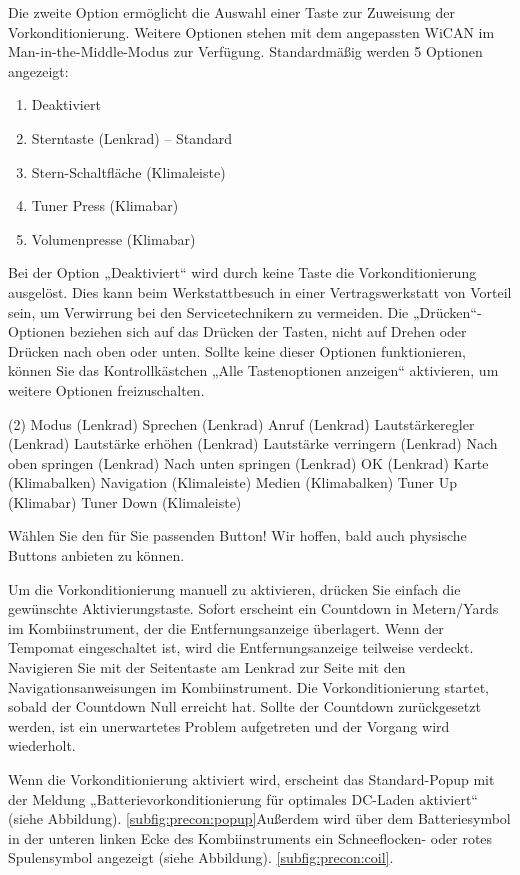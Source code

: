 \documentclass[superscriptaddress,onecolumn,floatfix]{revtex4-2}
\begin{document}
Die zweite Option ermöglicht die Auswahl einer Taste zur Zuweisung der Vorkonditionierung. Weitere Optionen stehen mit dem angepassten WiCAN im Man-in-the-Middle-Modus zur Verfügung. Standardmäßig werden 5 Optionen angezeigt:
\begin{enumerate}
  \item Deaktiviert
  \item Sterntaste (Lenkrad) -- Standard
  \item Stern-Schaltfläche (Klimaleiste)
  \item Tuner Press (Klimabar)
  \item Volumenpresse (Klimabar)
\end{enumerate}
Bei der Option „Deaktiviert“ wird durch keine Taste die Vorkonditionierung ausgelöst. Dies kann beim Werkstattbesuch in einer Vertragswerkstatt von Vorteil sein, um Verwirrung bei den Servicetechnikern zu vermeiden. Die „Drücken“-Optionen beziehen sich auf das Drücken der Tasten, nicht auf Drehen oder Drücken nach oben oder unten. Sollte keine dieser Optionen funktionieren, können Sie das Kontrollkästchen „Alle Tastenoptionen anzeigen“ aktivieren, um weitere Optionen freizuschalten.
\begin{tasks}(2)
  \task Modus (Lenkrad)
  \task Sprechen (Lenkrad)
  \task Anruf (Lenkrad)
  \task Lautstärkeregler (Lenkrad)
  \task Lautstärke erhöhen (Lenkrad)
  \task Lautstärke verringern (Lenkrad)
  \task Nach oben springen (Lenkrad)
  \task Nach unten springen (Lenkrad)
  \task OK (Lenkrad)
  \task Karte (Klimabalken)
  \task Navigation (Klimaleiste)
  \task Medien (Klimabalken)
  \task Tuner Up (Klimabar)
  \task Tuner Down (Klimaleiste)
\end{tasks}
Wählen Sie den für Sie passenden Button! Wir hoffen, bald auch physische Buttons anbieten zu können.

Um die Vorkonditionierung manuell zu aktivieren, drücken Sie einfach die gewünschte Aktivierungstaste. Sofort erscheint ein Countdown in Metern/Yards im Kombiinstrument, der die Entfernungsanzeige überlagert. Wenn der Tempomat eingeschaltet ist, wird die Entfernungsanzeige teilweise verdeckt. Navigieren Sie mit der Seitentaste am Lenkrad zur Seite mit den Navigationsanweisungen im Kombiinstrument. Die Vorkonditionierung startet, sobald der Countdown Null erreicht hat. Sollte der Countdown zurückgesetzt werden, ist ein unerwartetes Problem aufgetreten und der Vorgang wird wiederholt. 

Wenn die Vorkonditionierung aktiviert wird, erscheint das Standard-Popup mit der Meldung „Batterievorkonditionierung für optimales DC-Laden aktiviert“ (siehe Abbildung). \ref{subfig:precon:popup}Außerdem wird über dem Batteriesymbol in der unteren linken Ecke des Kombiinstruments ein Schneeflocken- oder rotes Spulensymbol angezeigt (siehe Abbildung). \ref{subfig:precon:coil}.
\end{document}
